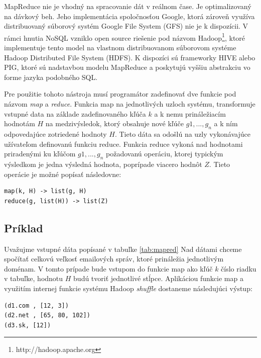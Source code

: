 \documentclass[11pt,twoside,a4paper]{book}
\begin{document}
MapReduce nie je vhodný na spracovanie dát v reálnom čase. Je optimalizovaný na dávkový beh. Jeho implementácia spoločnosťou Google, ktorá zároveň využíva distribuovaný súborový systém Google File System (GFS) \cite{ghemawat2003google} nie je k dispozícii. V rámci hnutia NoSQL vzniklo open source riešenie pod názvom Hadoop\footnote{http://hadoop.apache.org}, ktoré implementuje tento model na vlastnom distribuovanom súborovom systéme Hadoop Distributed File System (HDFS). K dispozíci sú frameworky HIVE alebo PIG, ktoré sú nadstavbou modelu MapReduce a poskytujú vyššiu abstrakciu vo forme jazyka podobného SQL.


Pre použitie tohoto nástroja musí programátor zadefinovať dve funkcie pod názvom \emph{map} a \emph{reduce}. Funkcia map na jednotlivých uzloch systému, transformuje vstupné data na základe zadefinovaného kľúča $k$ a k nemu prináležiacím hodnotám $H$ na medzivýsledok, ktorý obsahuje nové kľúče $g1,...,g_n$ a k ním odpovedajúce zotriedené hodnoty $H$. Tieto dáta sa odošlú na uzly vykonávajúce užívateľom definovanú funkciu reduce. Funkcia reduce vykoná nad hodnotami priradenými ku kľúčom $g1,...,g_n$ požadovanú operáciu, ktorej typickým výsledkom je jedna výsledná hodnota, poprípade viacero hodnôt $Z$. Tieto operácie je možné popísať následovne:

\begin{verbatim}
map(k, H) -> list(g, H)
reduce(g, list(H)) -> list(Z)
\end{verbatim}

\subsection{Príklad}

Uvažujme vstupné dáta popísané v tabuľke \ref{tab:mapred} Nad dátami chceme spočítať celkovú veľkosť emailových správ, ktoré prináležia jednotlivým doménam. V tomto prípade bude vstupom do funkcie map ako kľúč $k$ číslo riadku v tabuľke, hodnotu $H$ budú tvoriť jednotlivé stĺpce. Aplikáciou funkcie map a využitím internej funkcie systému Hadoop \emph{shuffle} dostaneme následujúci výstup:

\begin{verbatim}
(d1.com , [12, 3])
(d2.net , [65, 80, 102])
(d3.sk, [12])
\end{verbatim}
\end{document}
